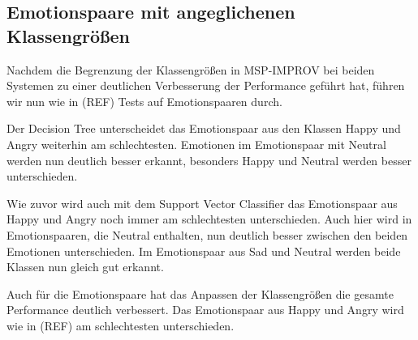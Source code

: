 \documentclass{article} %
\begin{document}
\subsection{Emotionspaare mit angeglichenen Klassengrößen}
Nachdem die Begrenzung der Klassengrößen in MSP-IMPROV bei beiden Systemen zu einer deutlichen Verbesserung der Performance geführt hat, führen wir nun wie in (REF) Tests auf Emotionspaaren durch. 

Der Decision Tree unterscheidet das Emotionspaar aus den Klassen Happy und Angry weiterhin am schlechtesten. Emotionen im Emotionspaar mit Neutral werden nun deutlich besser erkannt, besonders Happy und Neutral werden besser unterschieden. 

Wie zuvor wird auch mit dem Support Vector Classifier das Emotionspaar aus Happy und Angry noch immer am schlechtesten unterschieden. Auch hier wird in Emotionspaaren, die Neutral enthalten, nun deutlich besser zwischen den beiden Emotionen unterschieden. Im Emotionspaar aus Sad und Neutral werden beide Klassen nun gleich gut erkannt. 

Auch für die Emotionspaare hat das Anpassen der Klassengrößen die gesamte Performance deutlich verbessert. Das Emotionspaar aus Happy und Angry wird wie in (REF) am schlechtesten unterschieden.
\end{document}
